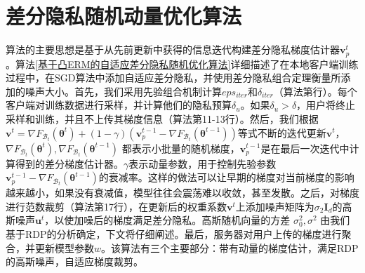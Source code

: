 \section{差分隐私随机动量优化算法}
算法的主要思想是基于从先前更新中获得的信息迭代构建差分隐私梯度估计器$\mathbf{v}_{p}^{t}$。算法\ref{基于凸ERM的自适应差分隐私随机优化算法}详细描述了在本地客户端训练过程中，在SGD算法中添加自适应差分隐私，并使用差分隐私组合定理衡量所添加的噪声大小。首先，我们采用先验组合机制计算$eps_{iter}$和$\delta_{iter}$（算法第行）。每个客户端对训练数据进行采样，并计算他们的隐私预算$\delta_{u}$。如果$\delta_{u}>\delta$，用户将终止采样和训练，并且不上传其梯度信息（算法第11-13行）。然后，我们根据$\mathbf{v}^{t}=\nabla F_{\mathcal{B}_{t}}\left(\boldsymbol{\theta}^{t}\right)+(1-\gamma)\left(\mathbf{v}_{p}^{t-1}-\nabla F_{\mathcal{B}_{t}}\left(\boldsymbol{\theta}^{t-1}\right)\right)$等式不断的迭代更新$\mathbf{v}^{t}$，$\nabla F_{\mathcal{B}_{t}}\left(\boldsymbol{\theta}^{t}\right), \nabla F_{\mathcal{B}_{t}}\left(\boldsymbol{\theta}^{t-1}\right)$ 都表示小批量的随机梯度，$\mathbf{v}_{p}^{t-1}$是在最后一次迭代中计算得到的差分梯度估计器。$\gamma$表示动量参数，用于控制先验参数$\mathbf{v}_{p}^{t-1}-\nabla F_{\mathcal{B}_{t}}\left(\boldsymbol{\theta}^{t-1}\right)$的衰减率。这样的做法可以让早期的梯度对当前梯度的影响越来越小，如果没有衰减值，模型往往会震荡难以收敛，甚至发散。之后，对梯度进行范数裁剪（算法第17行），在更新后的权重系数$\mathbf{v}^{t}$上添加噪声矩阵为$\sigma_{2} \mathbf{I}_{d}$的高斯噪声$\mathbf{u}^{t}$，以使加噪后的梯度满足差分隐私。高斯随机向量的方差 $\sigma_{0}^{2}, \sigma^{2}$ 由我们基于RDP的分析确定，下文将仔细阐述。最后，服务器对用户上传的梯度进行聚合，并更新模型参数$w$。该算法有三个主要部分：带有动量的梯度估计，满足RDP的高斯噪声，自适应梯度裁剪。

